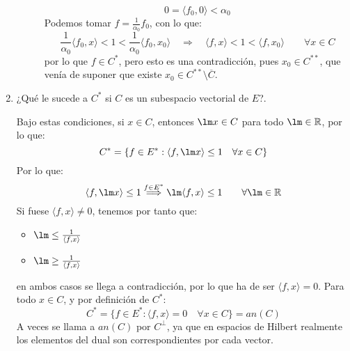 \begin{ejercicio}
\begin{enumerate}
\begin{description}
                    \begin{equation*}
                        0 = \langle f_0,0 \rangle  < \alpha_0
                    \end{equation*}
                    Podemos tomar $f=\frac{1}{\alpha_0}f_0$, con lo que:
                    \begin{equation*}
                        \frac{1}{\alpha_0} \langle f_0,x \rangle  < 1 < \frac{1}{\alpha_0}\langle f_0,x_0 \rangle  \quad \Longrightarrow \quad \langle f,x \rangle  < 1 < \langle f,x_0 \rangle  \qquad \forall x\in C
                    \end{equation*}
                    por lo que $f\in C^{\ast}$, pero esto es una contradicción, pues $x_0\in C^{\ast\ast}$, que venía de suponer que existe $x_0\in C^{\ast\ast}\setminus \overline{C}$.
            \end{description}
        \item ¿Qué le sucede a $C^\ast$ si $C$ es un subespacio vectorial de $E$?.

            Bajo estas condiciones, si $x\in C$, entonces $\lm x\in C$ para todo $\lm \in \mathbb{R}$, por lo que:
            \begin{equation*}
                C^\ast = \{f\in E^\ast : \langle f,\lm x \rangle \leq 1 \quad \forall x\in C \}
            \end{equation*}
            Por lo que:
            \begin{equation*}
                \langle f,\lm x \rangle  \leq 1 \stackrel{f\in E^\ast}{\Longrightarrow } \lm \langle f,x \rangle  \leq 1 \qquad \forall \lm \in \mathbb{R}
            \end{equation*}
            Si fuese $\langle f,x \rangle \neq 0 $, tenemos por tanto que:
            \begin{itemize}
                \item $\lm \leq \frac{1}{\langle f,x \rangle }$
                \item $\lm \geq \frac{1}{\langle f,x \rangle }$
            \end{itemize}
            en ambos casos se llega a contradicción, por lo que ha de ser $\langle f,x \rangle = 0 $. Para todo $x\in C$, y por definición de $C^\ast$:
            \begin{equation*}
                C^\ast = \{f\in E^\ast : \langle f,x \rangle = 0 \quad \forall x\in C \} = an(C)
            \end{equation*}
            A veces se llama a $an(C)$ por $C^\perp$, ya que en espacios de Hilbert realmente los elementos del dual son correspondientes por cada vector.
    \end{enumerate}
\end{ejercicio}



